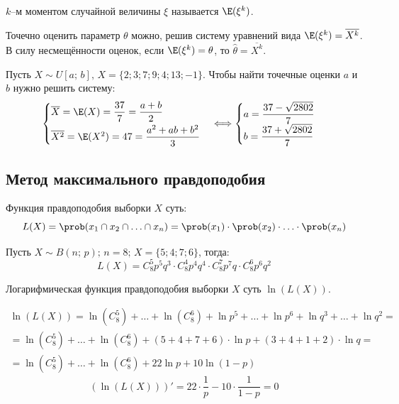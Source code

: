 \documentclass[12pt]{article}
\begin{document}
\begin{definition}
    $k$–м моментом случайной величины $\xi$ называется $\E(\xi^k)$.
\end{definition}
\begin{theorem}
    Точечно оценить параметр $\theta$ можно, решив систему уравнений вида $\E(\xi^k)=\overline{X^k}$. В силу несмещённости оценок, если $\E(\xi^k)=\theta$, то $\hat\theta=\overline{X^k}$.
\end{theorem}
\begin{example}
    Пусть $X\sim U[a;\,b],\,X=\{2;3;7;9;4;13;-1\}$. Чтобы найти точечные оценки $a$ и $b$ нужно решить систему:
    $$\begin{cases}
        \overline{X}=\E(X)=\dfrac{37}{7}=\dfrac{a+b}{2}\\[2\jot]
        \overline{X^2}=\E(X^2)=47=\dfrac{a^2+ab+b^2}{3}
    \end{cases}\Longleftrightarrow\begin{cases}
        a=\dfrac{37-\sqrt{2802}}{7}\\
        b=\dfrac{37+\sqrt{2802}}{7}
    \end{cases}$$
\end{example}

\subsection{Метод максимального правдоподобия}

\begin{definition}
    Функция правдоподобия выборки $X$ суть:
    $$L(X)=\prob(x_1\cap x_2\cap\ldots\cap x_n)=\prob(x_1)\cdot\prob(x_2)\cdot\ldots\cdot\prob(x_n)$$
\end{definition}
\begin{example}
    Пусть $X\sim B(n;\,p);\,n=8;\,X=\{5;4;7;6\}$, тогда:
    $$L(X)=C_8^5p^5q^3\cdot C_8^4p^4q^4\cdot C_8^7p^7q\cdot C_8^6p^6q^2$$
\end{example}
\begin{definition}
    Логарифмическая функция правдоподобия выборки $X$ суть $\ln(L(X))$.
\end{definition}
\begin{example}
    \begin{multline*}
        \ln(L(X))=\ln(C_8^5)+\ldots+\ln(C_8^6)+\ln p^5+\ldots+\ln p^6+\ln q^3+\ldots+\ln q^2=\\
        =\ln(C_8^5)+\ldots+\ln(C_8^6)+(5+4+7+6)\cdot\ln p+(3+4+1+2)\cdot\ln q=\\
        =\ln(C_8^5)+\ldots+\ln(C_8^6)+22\ln p+10\ln(1-p)
    \end{multline*}
    $$\left(\ln(L(X))\right)'=22\cdot\dfrac{1}{p}-10\cdot\dfrac{1}{1-p}=0$$
\end{example}
\end{document}
